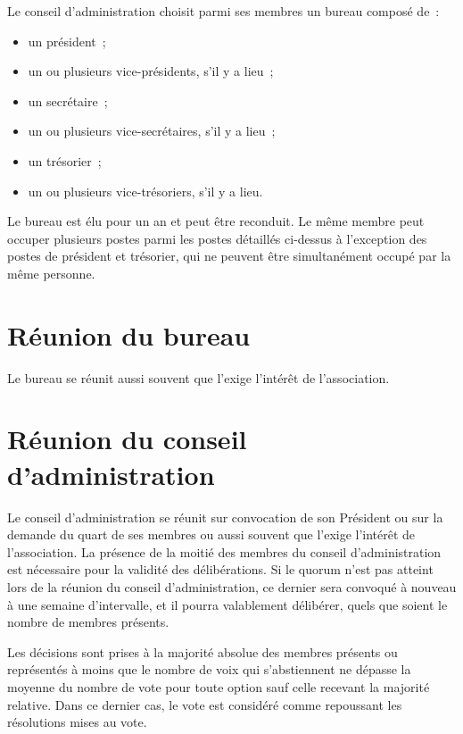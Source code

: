 \documentclass[12 pt]{article}
\begin{document}
Le conseil d'administration choisit parmi ses membres un bureau
composé de~:

\begin{itemize}
\item un président~;
\item un ou plusieurs vice-présidents, s'il y a lieu~;
\item un secrétaire~;
\item un ou plusieurs vice-secrétaires, s'il y a lieu~;
\item un trésorier~;
\item un ou plusieurs vice-trésoriers, s'il y a lieu.
\end{itemize}

Le bureau est élu pour un an et peut être reconduit. Le même membre
peut occuper plusieurs postes parmi les postes détaillés ci-dessus à
l'exception des postes de président et trésorier, qui ne peuvent être
simultanément occupé par la même personne.

\section{Réunion du bureau}
\label{sec:reunion-du-bureau}

Le bureau se réunit aussi souvent que l'exige l'intérêt de
l'association.

\section{Réunion du conseil d'administration}
\label{sec:reunion-du-conseil-d-administration}

Le conseil d'administration se réunit sur convocation de son Président
ou sur la demande du quart de ses membres ou aussi souvent que l'exige
l'intérêt de l'association. La présence de la moitié des membres du
conseil d'administration est nécessaire pour la validité des
délibérations. Si le quorum n'est pas atteint lors de la réunion du
conseil d'administration, ce dernier sera convoqué à nouveau à une
semaine d'intervalle, et il pourra valablement délibérer, quels que
soient le nombre de membres présents.

Les décisions sont prises à la majorité absolue des membres présents
ou représentés à moins que le nombre de voix qui s'abstiennent ne dépasse
la moyenne du nombre de vote pour toute option sauf celle recevant la
majorité relative.  Dans ce dernier cas, le vote est considéré comme
repoussant les résolutions mises au vote.
\end{document}
